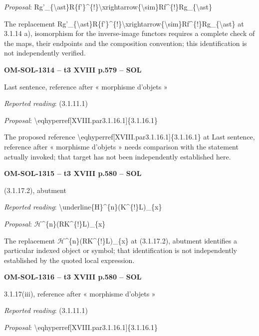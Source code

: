 \emph{Proposal}: Rg'\_\{\textbackslash{}ast\}R\{f'\}\textasciicircum{}\{!\}\textbackslash{}xrightarrow\{\textbackslash{}sim\}Rf\textasciicircum{}\{!\}Rg\_\{\textbackslash{}ast\}\par
The replacement Rg'\_\{\textbackslash{}ast\}R\{f'\}\textasciicircum{}\{!\}\textbackslash{}xrightarrow\{\textbackslash{}sim\}Rf\textasciicircum{}\{!\}Rg\_\{\textbackslash{}ast\} at 3.1.14 a), isomorphism for the inverse-image functors requires a complete check of the maps, their endpoints and the composition convention; this identification is not independently verified.\par
\par\noindent\textbf{OM-SOL-1314 -- t3 XVIII p.579 -- SOL}\par
Last sentence, reference after « morphisme d'objets »\par
\emph{Reported reading}: (3.1.11.1)\par
\emph{Proposal}: \textbackslash{}eqhyperref[XVIII.par3.1.16.1]\{3.1.16.1\}\par
The proposed reference \textbackslash{}eqhyperref[XVIII.par3.1.16.1]\{3.1.16.1\} at Last sentence, reference after « morphisme d'objets » needs comparison with the statement actually invoked; that target has not been independently established here.\par
\par\noindent\textbf{OM-SOL-1315 -- t3 XVIII p.580 -- SOL}\par
(3.1.17.2), abutment\par
\emph{Reported reading}: \textbackslash{}underline\{H\}\textasciicircum{}\{n\}(K\textasciicircum{}\{!\}L)\_\{x\}\par
\emph{Proposal}: \ensuremath{\mathcal{H}}\textasciicircum{}\{n\}(RK\textasciicircum{}\{!\}L)\_\{x\}\par
The replacement \ensuremath{\mathcal{H}}\textasciicircum{}\{n\}(RK\textasciicircum{}\{!\}L)\_\{x\} at (3.1.17.2), abutment identifies a particular indexed object or symbol; that identification is not independently established by the quoted local expression.\par
\par\noindent\textbf{OM-SOL-1316 -- t3 XVIII p.580 -- SOL}\par
3.1.17(iii), reference after « morphisme d'objets »\par
\emph{Reported reading}: (3.1.11.1)\par
\emph{Proposal}: \textbackslash{}eqhyperref[XVIII.par3.1.16.1]\{3.1.16.1\}\par
